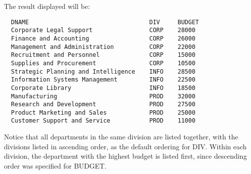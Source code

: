 The result displayed will be:

\begin{screen}
\begin{verbatim}
  DNAME                                  DIV     BUDGET
  Corporate Legal Support                CORP    28000
  Finance and Accounting                 CORP    26000
  Management and Administration          CORP    22000
  Recruitment and Personnel              CORP    15000
  Supplies and Procurement               CORP    10500
  Strategic Planning and Intelligence    INFO    28500
  Information Systems Management         INFO    22500
  Corporate Library                      INFO    18500
  Manufacturing                          PROD    32000
  Research and Development               PROD    27500
  Product Marketing and Sales            PROD    25000
  Customer Support and Service           PROD    11000
\end{verbatim}
\end{screen}

Notice that all departments in the same division are listed together,
with the divisions listed in ascending order, as the default ordering
for DIV.  Within each division, the department with the highest budget
is listed first, since descending order was specified for BUDGET.

